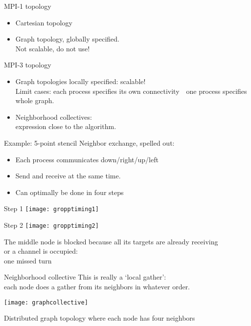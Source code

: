 \begin{numberedframe}{MPI-1 topology}
  \begin{itemize}
  \item Cartesian topology
  \item Graph topology, globally specified.\\
    Not scalable, do not use!
  \end{itemize}
\end{numberedframe}

\begin{numberedframe}{MPI-3 topology}
  \begin{itemize}
  \item Graph topologies locally specified: scalable!\\
    Limit cases: each process specifies its own connectivity~\
    one process specifies whole graph.
  \item Neighborhood collectives:\\
    expression close to the algorithm.
  \end{itemize}
\end{numberedframe}


\begin{numberedframe}{Example: 5-point stencil}
  Neighbor exchange,
  spelled out:
  \begin{itemize}
  \item Each process communicates down/right/up/left
  \item Send and receive at the same time.
  \item Can optimally be done in four steps
  \end{itemize}
\end{numberedframe}

\begin{numberedframe}{Step 1}
  \texttt{[image: gropptiming1]}
\end{numberedframe}

\begin{numberedframe}{Step 2}
  \texttt{[image: gropptiming2]}

  The middle node is blocked because all its targets
  are already receiving\\
  or a channel is occupied:\\
  one missed turn
\end{numberedframe}

\begin{numberedframe}{Neighborhood collective}
  \label{fig:graphcollective}
  This is really a `local gather':\\
  each node does a gather from its neighbors in whatever order.\\
  \indexmpishow{MPI_Neighbor_allgather}

  \texttt{[image: graphcollective]}

  Distributed graph topology where each
  node has four neighbors
\end{numberedframe}

